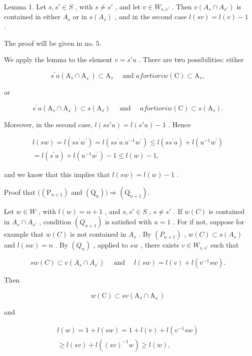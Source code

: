 Lemma 1. Let \(s, s' \in S\) , with \(s \neq s'\) , and let \(v \in W_{s,s'}\) . Then \(v(A_s \cap A_{s'})\) is contained in either \(A_s\) or in \(s(A_s)\) , and in the second case \(l(sv) = l(v) - 1\) .

The proof will be given in no. 5.

We apply the lemma to the element \(v = s'u\) . There are two possibilities: either

\[
  s ^ {\prime} u \left(\mathrm{A} _ {s} \cap \mathrm{A} _ {s ^ {\prime}}\right) \subset \mathrm{A} _ {s} \quad \text { and } a fortiori w (\mathrm{C}) \subset \mathrm{A} _ {s},
\]

or

\[
  s ^ {\prime} u \left(\mathrm{A} _ {s} \cap \mathrm{A} _ {s ^ {\prime}}\right) \subset s \left(\mathrm{A} _ {s}\right) \quad \text { and } \quad a fortiori w (\mathrm{C}) \subset s \left(\mathrm{A} _ {s}\right).
\]

Moreover, in the second case, \(l(ss'u) = l(s'u) - 1\) . Hence

\[
\begin{array}{c} l (s w) = l (s s ^ {\prime} w ^ {\prime}) = l (s s ^ {\prime} u. u ^ {- 1} w ^ {\prime}) \leqslant l (s s ^ {\prime} u) + l (u ^ {- 1} w ^ {\prime}) \\ = l (s ^ {\prime} u) + l (u ^ {- 1} w ^ {\prime}) - 1 \leqslant l (w) - 1, \end{array}
\]

and we know that this implies that \(l(sw) = l(w) - 1\) .

Proof that \(((\mathrm{P}_{n + 1})\) and \((\mathrm{Q}_n))\Longrightarrow (\mathrm{Q}_{n + 1}).\)

Let \(w \in W\) , with \(l(w) = n + 1\) , and \(s, s' \in S\) , \(s \neq s'\) . If \(w(C)\) is contained in \(A_s \cap A_{s'}\) , condition \((Q_{n+1})\) is satisfied with \(u = 1\) . For if not, suppose for example that \(w(C)\) is not contained in \(A_s\) . By \((P_{n+1})\) , \(w(C) \subset s(A_s)\) and \(l(sw) = n\) . By \((Q_n)\) , applied to \(sw\) , there exists \(v \in W_{s,s'}\) such that

\[
s w (C) \subset v \left(A _ {s} \cap A _ {s ^ {\prime}}\right) \quad \text { and } \quad l (s w) = l (v) + l \left(v ^ {- 1} s w\right).
\]

Then

\[
w (\mathrm{C}) \subset s v \left(\mathrm{A} _ {s} \cap \mathrm{A} _ {s ^ {\prime}}\right)
\]

and

\[
\begin{array}{c} l (w) = 1 + l (s w) = 1 + l (v) + l (v ^ {- 1} s w) \\ \geqslant l (s v) + l ((s v) ^ {- 1} w) \geqslant l (w), \end{array}
\]

